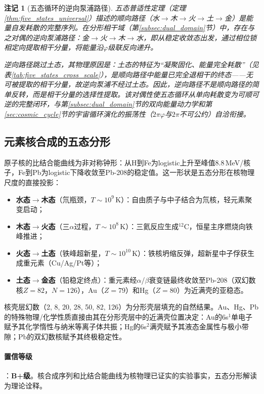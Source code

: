 \documentclass[12pt,a4paper,twocolumn]{article}
\renewcommand{\phi}{\varphi}
\newtheorem{remark}[theorem]{注记}
\begin{document}
\begin{remark}[五态循环的逆向泵浦路径]
五态普适性定理（定理\ref{thm:five_states_universal}）描述的顺向路径（水$\to$木$\to$火$\to$土$\to$金）是能量自发耗散的完整序列。在分形相干域（第\ref{subsec:dual_domain}节）中，存在与之对偶的逆向泵浦路径：金$\to$火$\to$木$\to$水，即从稳定收敛态出发，通过相位锁相定向提取相干分量，将能量沿$\phi$级联反向递升。

逆向路径跳过土态，其物理原因是：土态的特征为``凝聚固化、能量完全耗散''（见表\ref{tab:five_states_cross_scale}），是顺向路径中能量已完全退相干的终态——无可被提取的相干分量，故逆向泵浦不经过土态。因此，逆向路径不是顺向路径的简单反转，而是相干分量的选择性提取。该对偶性使五态循环从单向耗散变为可顺可逆的完整闭环，与第\ref{subsec:dual_domain}节的双向能量动力学和第\ref{sec:cosmic_cycle}节的宇宙循环演化的振荡性（$2\pi\phi$与$2\pi$不可公约）自洽衔接。
\end{remark}

\subsection{元素核合成的五态分形}
\label{subsec:nucleosynthesis}

原子核的比结合能曲线为非对称钟形：从H到Fe为logistic上升至峰值8.8\,MeV/核子，Fe到Pb为logistic下降收敛至Pb-208的稳定值。这一形状是五态分形在核物理尺度的直接投影：

\begin{itemize}
\item \textbf{水态$\to$木态}（氘瓶颈，$T\sim10^9$\,K）：自由质子与中子结合为氘核，轻元素聚变启动；
\item \textbf{木态$\to$火态}（三$\alpha$过程，$T\sim10^8$\,K）：三氦反应生成$^{12}$C，恒星主序燃烧向铁峰推进；
\item \textbf{火态$\to$土态}（铁峰超新星，$T\sim10^{10}$\,K）：铁核坍缩反弹，超新星中子俘获生成重元素（Cu/Ag/Pt等）；
\item \textbf{土态$\to$金态}（铅稳定终点）：重元素经$\alpha$/$\beta$衰变链最终收敛至Pb-208（双幻数核$Z=82$，$N=126$），Au（$Z=79$）和Hg（$Z=80$）为近满壳的亚稳态。
\end{itemize}

核壳层幻数（2, 8, 20, 28, 50, 82, 126）为分形壳层填充的自然结果。Au、Hg、Pb的特殊物理/化学性质直接由其在分形壳层中的近满壳位置决定：Au的6s$^1$单电子赋予其化学惰性与纳米等离子体共振；Hg的6s$^2$满壳赋予其液态金属性与极小带隙；Pb的双幻数核赋予其终极稳定性。

\paragraph{置信等级}：\textbf{B+级}。核合成序列和比结合能曲线为核物理已证实的实验事实，五态分形解读为理论诠释。
\end{document}
